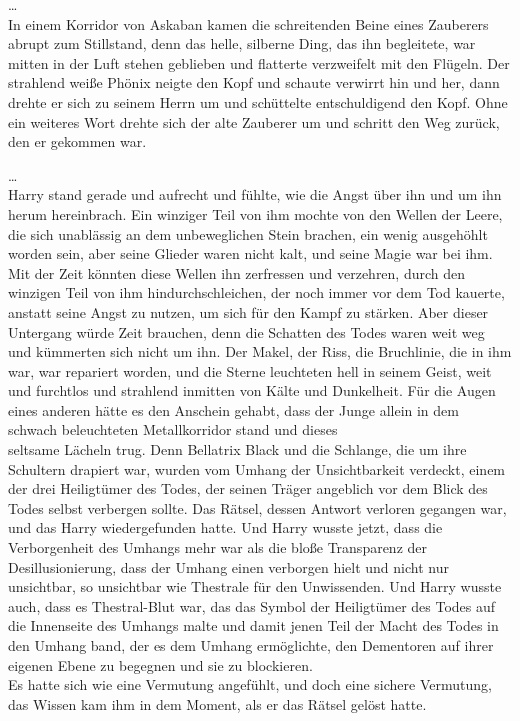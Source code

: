 {…\\ In einem Korridor von Askaban kamen die schreitenden Beine eines Zauberers abrupt zum Stillstand, denn das helle, silberne Ding, das ihn begleitete, war mitten in der Luft stehen geblieben und flatterte verzweifelt mit den Flügeln. Der strahlend weiße Phönix neigte den Kopf und schaute verwirrt hin und her, dann drehte er sich zu seinem Herrn um und schüttelte entschuldigend den Kopf. Ohne ein weiteres Wort drehte sich der alte Zauberer um und schritt den Weg zurück, den er gekommen war.

…\\ Harry stand gerade und aufrecht und fühlte, wie die Angst über ihn und um ihn herum hereinbrach. Ein winziger Teil von ihm mochte von den Wellen der Leere, die sich unablässig an dem unbeweglichen Stein brachen, ein wenig ausgehöhlt worden sein, aber seine Glieder waren nicht kalt, und seine Magie war bei ihm. Mit der Zeit könnten diese Wellen ihn zerfressen und verzehren, durch den winzigen Teil von ihm hindurchschleichen, der noch immer vor dem Tod kauerte, anstatt seine Angst zu nutzen, um sich für den Kampf zu stärken. Aber dieser Untergang würde Zeit brauchen, denn die Schatten des Todes waren weit weg und kümmerten sich nicht um ihn. Der Makel, der Riss, die Bruchlinie, die in ihm war, war repariert worden, und die Sterne leuchteten hell in seinem Geist, weit und furchtlos und strahlend inmitten von Kälte und Dunkelheit. Für die Augen eines anderen hätte es den Anschein gehabt, dass der Junge allein in dem schwach beleuchteten Metallkorridor stand und dieses\\ seltsame Lächeln trug. Denn Bellatrix Black und die Schlange, die um ihre Schultern drapiert war, wurden vom Umhang der Unsichtbarkeit verdeckt, einem der drei Heiligtümer des Todes, der seinen Träger angeblich vor dem Blick des Todes selbst verbergen sollte. Das Rätsel, dessen Antwort verloren gegangen war, und das Harry wiedergefunden hatte. Und Harry wusste jetzt, dass die Verborgenheit des Umhangs mehr war als die bloße Transparenz der Desillusionierung, dass der Umhang einen verborgen hielt und nicht nur unsichtbar, so unsichtbar wie Thestrale für den Unwissenden. Und Harry wusste auch, dass es Thestral-Blut war, das das Symbol der Heiligtümer des Todes auf die Innenseite des Umhangs malte und damit jenen Teil der Macht des Todes in den Umhang band, der es dem Umhang ermöglichte, den Dementoren auf ihrer eigenen Ebene zu begegnen und sie zu blockieren.\\ Es hatte sich wie eine Vermutung angefühlt, und doch eine sichere Vermutung, das Wissen kam ihm in dem Moment, als er das Rätsel gelöst hatte.

}
